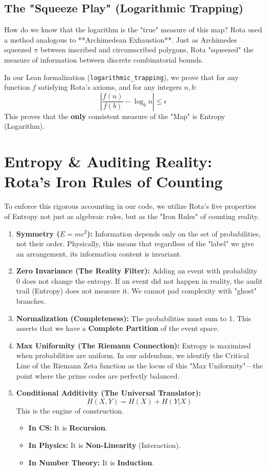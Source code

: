 \documentclass{report}
\begin{document}
\subsection{The "Squeeze Play" (Logarithmic Trapping)}
How do we know that the logarithm is the "true" measure of this map? Rota used a method analogous to **Archimedean Exhaustion**. Just as Archimedes squeezed $\pi$ between inscribed and circumscribed polygons, Rota "squeezed" the measure of information between discrete combinatorial bounds.

In our Lean formalization (\texttt{logarithmic\_trapping}), we prove that for any function $f$ satisfying Rota's axioms, and for any integers $n, b$:
$$ \left| \frac{f(n)}{f(b)} - \log_b n \right| \le \epsilon $$
This proves that the \textbf{only} consistent measure of the "Map" is Entropy (Logarithm).

\section{Entropy \& Auditing Reality: Rota's Iron Rules of Counting}

To enforce this rigorous accounting in our code, we utilize Rota's five properties of Entropy not just as algebraic rules, but as the "Iron Rules" of counting reality.

\begin{enumerate}
    \item \textbf{Symmetry ($E=mc^2$):} Information depends only on the set of probabilities, not their order. Physically, this means that regardless of the "label" we give an arrangement, its information content is invariant.
    \item \textbf{Zero Invariance (The Reality Filter):} Adding an event with probability 0 does not change the entropy. If an event did not happen in reality, the audit trail (Entropy) does not measure it. We cannot pad complexity with "ghost" branches.
    \item \textbf{Normalization (Completeness):} The probabilities must sum to 1. This asserts that we have a \textbf{Complete Partition} of the event space.
    \item \textbf{Max Uniformity (The Riemann Connection):} Entropy is maximized when probabilities are uniform. In our addendum, we identify the Critical Line of the Riemann Zeta function as the locus of this "Max Uniformity"—the point where the prime codes are perfectly balanced.
    \item \textbf{Conditional Additivity (The Universal Translator):}
    $$ H(X, Y) = H(X) + H(Y|X) $$
    This is the engine of construction.
    \begin{itemize}
        \item \textbf{In CS:} It is \textbf{Recursion}.
        \item \textbf{In Physics:} It is \textbf{Non-Linearity} (Interaction).
        \item \textbf{In Number Theory:} It is \textbf{Induction}.
    \end{itemize}
\end{enumerate}
\end{document}
